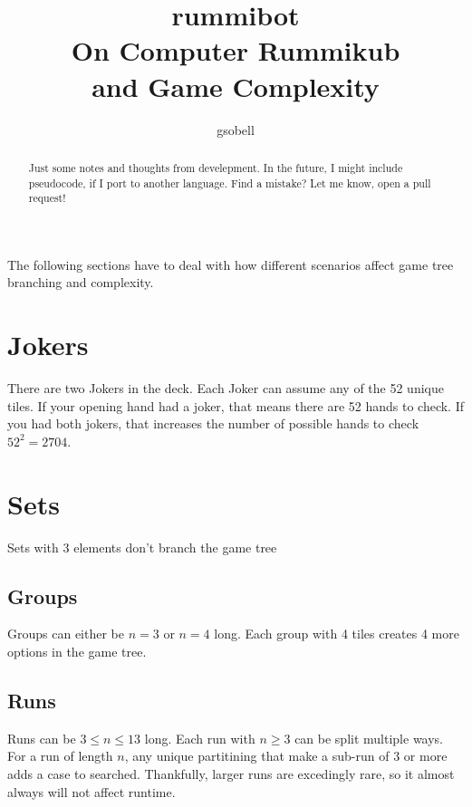 \documentclass[11pt]{article}
\title{%
    \textbf{rummibot} \\
    \large On Computer Rummikub\\ and Game Complexity}
\author{gsobell}
\date{}
\begin{document}
\maketitle
{}

\begin{abstract}
Just some notes and thoughts from develepment.
In the future, I might include pseudocode, if I port to another language. Find a mistake? Let me know, open a pull request!
\end{abstract}
The following sections have to deal with how different scenarios affect game tree branching and complexity.


\section{Jokers}
There are two Jokers in the deck. Each Joker can assume any of the 52 unique tiles. If your opening hand had a joker, that means there are 52 hands to check. If you had both jokers, that increases the number of possible hands to check $52^2 =  2704$.


\section{Sets}
Sets with 3 elements don't branch the game tree

\subsection{Groups}
Groups can either be $n = 3$ or $n = 4$ long.
Each group with 4 tiles creates 4 more options in the game tree.

\subsection{Runs}
Runs can be $3 \le n \le 13$ long. Each run with $n \ge 3$ can be split multiple ways.
For a run of length $n$, any unique partitining that make a sub-run of 3 or more adds a case to searched.
Thankfully, larger runs are excedingly rare, so it almost always will not affect runtime.
\end{document}
